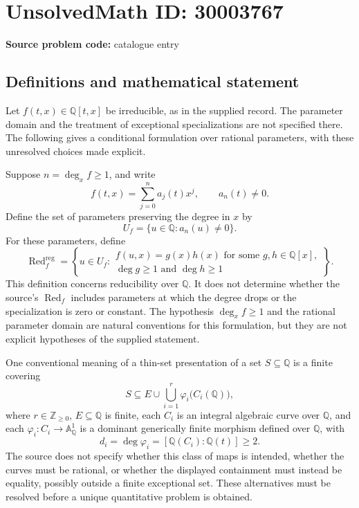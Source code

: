 \documentclass[11pt]{article}
\newcommand{\Z}{\mathbb{Z}}
\newcommand{\Q}{\mathbb{Q}}
\begin{document}
\section*{UnsolvedMath ID: 30003767}
\textbf{Source problem code:} catalogue entry
\subsection{Definitions and mathematical statement}
Let \(f(t,x)\in\Q[t,x]\) be irreducible, as in the supplied record. The parameter domain and the treatment of exceptional specializations are not specified there. The following gives a conditional formulation over rational parameters, with these unresolved choices made explicit.

Suppose \(n=\deg_x f\geq 1\), and write
\[
f(t,x)=\sum_{j=0}^{n}a_j(t)x^j,\qquad a_n(t)\neq 0.
\]
Define the set of parameters preserving the degree in \(x\) by
\[
U_f=\{u\in\Q:a_n(u)\neq 0\}.
\]
For these parameters, define
\[
\operatorname{Red}^{\mathrm{reg}}_f
=\left\{u\in U_f:
\begin{array}{l}
 f(u,x)=g(x)h(x)\text{ for some }g,h\in\Q[x],\\
 \deg g\geq 1\text{ and }\deg h\geq 1
\end{array}\right\}.
\]
This definition concerns reducibility over \(\Q\). It does not determine whether the source's \(\operatorname{Red}_f\) includes parameters at which the degree drops or the specialization is zero or constant. The hypothesis \(\deg_x f\geq1\) and the rational parameter domain are natural conventions for this formulation, but they are not explicit hypotheses of the supplied statement.

One conventional meaning of a thin-set presentation of a set \(S\subseteq\Q\) is a finite covering
\[
S\subseteq E\cup\bigcup_{i=1}^{r}\varphi_i\bigl(C_i(\Q)\bigr),
\]
where \(r\in\Z_{\geq0}\), \(E\subseteq\Q\) is finite, each \(C_i\) is an integral algebraic curve over \(\Q\), and each \(\varphi_i:C_i\to\mathbb A^1_{\Q}\) is a dominant generically finite morphism defined over \(\Q\), with
\[
d_i=\deg\varphi_i=[\Q(C_i):\Q(t)]\geq2.
\]
The source does not specify whether this class of maps is intended, whether the curves must be rational, or whether the displayed containment must instead be equality, possibly outside a finite exceptional set. These alternatives must be resolved before a unique quantitative problem is obtained.
\end{document}
